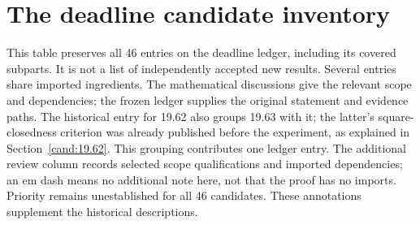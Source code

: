\section{The deadline candidate inventory}
\label{app:inventory}
This table preserves all 46 entries on the deadline ledger, including its
covered subparts. It is not a list of independently accepted new results.
Several entries share imported ingredients. The mathematical discussions
give the relevant scope and dependencies; the frozen ledger supplies the
original statement and evidence paths. The historical entry for 19.62
also groups 19.63 with it; the latter's square-closedness criterion was
already published before the experiment, as explained in
Section~\ref{cand:19.62}. This grouping contributes one ledger entry.
The additional review column records selected scope qualifications and
imported dependencies; an em dash means no additional note here, not
that the proof has no imports. Priority remains unestablished for all
46 candidates. These annotations supplement the historical descriptions.


